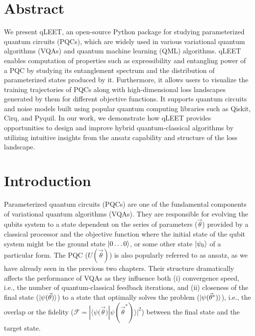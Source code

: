 \section{\label{qleet-sec:abstract}Abstract}

We present qLEET, an open-source Python package for studying parameterized quantum circuits (PQCs), which are widely used in various variational quantum algorithms (VQAs) and quantum machine learning (QML) algorithms. qLEET enables computation of properties such as expressibility and entangling power of a PQC by studying its entanglement spectrum and the distribution of parameterized states produced by it. Furthermore, it allows users to visualize the training trajectories of PQCs along with high-dimensional loss landscapes generated by them for different objective functions. It supports quantum circuits and noise models built using popular quantum computing libraries such as Qiskit, Cirq, and Pyquil. In our work, we demonstrate how qLEET provides opportunities to design and improve hybrid quantum-classical algorithms by utilizing intuitive insights from the ansatz capability and structure of the loss landscape.

\section{\label{qleet-sec:intro}Introduction}

Parameterized quantum circuits (PQCs) are one of the fundamental components of variational quantum algorithms (VQAs). They are responsible for evolving the qubits system to a state dependent on the series of parameters ($\vec{\theta}$) provided by a classical processor and the objective function where the initial state of the qubit system might be the ground state $\ket{0\ldots0}$, or some other state $\ket{\psi_0}$ of a particular form. The PQC ($U(\vec{\theta})$) is also popularly referred to as ansatz, as we have already seen in the previous two chapters. Their structure dramatically affects the performance of VQAs as they influence both (i) convergence speed, i.e., the number of quantum-classical feedback iterations, and (ii) closeness of the final state ($\ket{\psi({\vec{\theta}})}$) to a state that optimally solves the problem ($\ket{\psi({\vec{\theta}^*})}$), i.e., the overlap or the fidelity ($\mathcal{F} = |\langle\psi({\vec{\theta})} | \psi({\vec{\theta}^*})\rangle|^{2}$) between the final state and the target state. 

